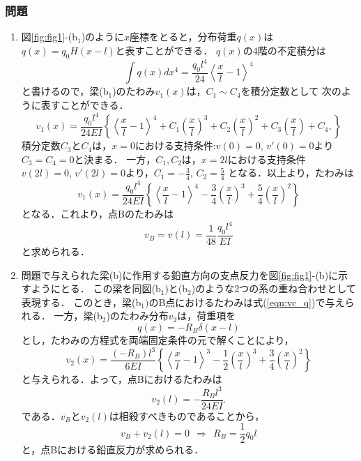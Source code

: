 \documentclass[10pt,a4j]{jarticle}
\begin{document}
\subsubsection*{問題}
\begin{enumerate}
\item
図\ref{fig:fig1}-(b$_1$)のように$x$座標をとると，分布荷重$q(x)$は
$q(x)=q_0H\left(x-l\right)$と表すことができる．
$q(x)$の4階の不定積分は
\begin{equation}
	\int q(x) dx^4
	= 
	\frac{q_0l^4}{24}
	\left< \frac{x}{l} -1\right> ^4
\end{equation}
と書けるので，梁(b$_1$)のたわみ$v_1(x)$は，$C_1\sim C_4$を積分定数として
次のように表すことができる．
	\begin{equation}
	v_1(x)=\frac{q_0l^4}{24EI}\left\{
		\left< \frac{x}{l} -1 \right> ^4
		+
		C_1
		\left(\frac{x}{l} \right)^3
		+
		C_2
		\left(\frac{x}{l} \right)^2
		+
		C_3
		\left(\frac{x}{l} \right)
		+
		C_4,
	\right\}
	\end{equation}
積分定数$C_3$と$C_4$は，$x=0$における支持条件:$v(0)=0,\, v'(0)=0$より$C_3=C_4=0$と決まる．
一方，$C_1,C_2$は，$x=2l$における支持条件
$v(2l)=0,\, v'(2l)=0$より，$C_1=-\frac{3}{4},\, C_2=\frac{5}{4}$
となる．以上より，たわみは
	\begin{equation}
	v_1(x)=\frac{q_0l^4}{24EI}\left\{
		\left< \frac{x}{l} -1\right> ^4
		-
		\frac{3}{4}
		\left(\frac{x}{l} \right)^3
		+
		\frac{5}{4}
		\left(\frac{x}{l} \right)^2
	\right\}
	\label{eqn:vx1}
	\end{equation}
となる．これより，点Bのたわみは
\begin{equation}
	v_B=v\left( l \right) 
	= \frac{1}{48}\frac{q_0l^4}{EI}
	\label{eqn:vc_q}
\end{equation}
と求められる．
\item
問題で与えられた梁(b)に作用する鉛直方向の支点反力を図\ref{fig:fig1}-(b)に示すようにとる．
この梁を同図(b$_1$)と(b$_2$)のような2つの系の重ね合わせとして表現する．
このとき，梁(b$_1)$のB点におけるたわみは式(\ref{eqn:vc_q})で与えられる．
一方，梁(b$_2$)のたわみ分布$v_2$は，荷重項を
\begin{equation}
	q(x)=-R_B\delta\left(x-l\right)
\end{equation}
とし，たわみの方程式を両端固定条件の元で解くことにより，
\begin{equation}
	v_2(x)=\frac{(-R_B)l^3}{6EI}\left\{
		\left< \frac{x}{l}-1\right>^3
		-
		\frac{1}{2}
		\left(\frac{x}{l} \right)^3
		+
		\frac{3}{4}
		\left(\frac{x}{l} \right)^2
	\right\}
	\label{eqn:vx2}
\end{equation}
と与えられる．よって，点Bにおけるたわみは
\begin{equation}
	v_2\left( l \right) 
	= -\frac{R_Bl^3}{24EI}.
	\label{eqn:vc_P}
\end{equation}
である．$v_B$と$v_2(l)$は相殺すべきものであることから，
\begin{equation}
	v_B+v_2(l)=0 \ \ \Rightarrow \ \ R_B=\frac{1}{2}q_0l
	\label{eqn:RB}
\end{equation}
と，点Bにおける鉛直反力が求められる．\\


\end{enumerate}
\end{document}
